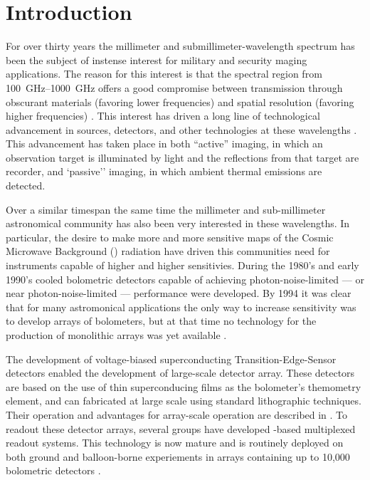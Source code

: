 \chapter{Introduction} \label{c:intro}



For over thirty years the millimeter and submillimeter-wavelength spectrum has been the subject of instense interest for military and security maging applications.
The reason for this interest is that the spectral region from \SIrange{100}{1000}{\GHz} offers a good compromise between transmission through obscurant materials (favoring lower frequencies) and spatial resolution (favoring higher frequencies) \cite{kruse_why_1981}.
This interest has driven a long line of technological advancement in sources, detectors, and other technologies at these wavelengths \cite{popovic_thz_2011}.
This advancement has taken place in both ``active'' imaging, in which an observation target is illuminated by light and the reflections from that target are recorder, and `passive'' imaging, in which ambient thermal emissions are detected.

Over a similar timespan the same time the millimeter and sub-millimeter astronomical community has also been very interested in these wavelengths.
In particular, the desire to make more and more sensitive maps of the Cosmic Microwave Background (\CMB) radiation have driven this communities need for instruments capable of higher and higher sensitivies.
During the 1980's and early 1990's cooled bolometric detectors capable of achieving photon-noise-limited --- or near photon-noise-limited --- performance were developed.
By 1994 it was clear that for many astromonical applications the only way to increase sensitivity was to develop arrays of bolometers, but at that time no technology for the production of monolithic arrays was yet available \cite{richards_bolometers_1994}.

The development of voltage-biased superconducting Transition-Edge-Sensor detectors enabled the development of large-scale detector array.
These detectors are based on the use of thin superconducing films as the bolometer's themometry element, and can fabricated at large scale using standard lithographic techniques.
Their operation and advantages for array-scale operation are described in .
To readout these detector arrays, several groups have developed \SQUID-based multiplexed readout systems.
This technology is now mature and is routinely deployed on both ground and balloon-borne experiements in arrays containing up to 10,000 bolometric detectors \cite{holland_scuba-2:_2013}.

